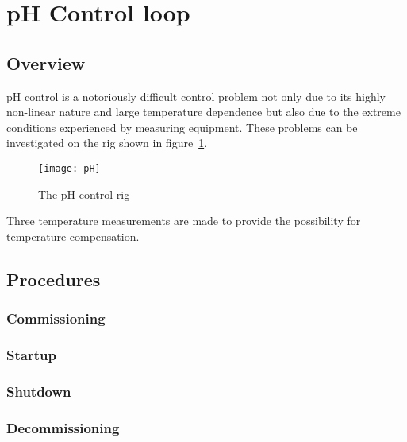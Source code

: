 \section{pH Control loop}
\subsection{Overview}
pH control is a notoriously difficult control problem not only due to its highly non-linear nature and large temperature dependence but also due to the extreme conditions experienced by measuring equipment. These problems can be investigated on the rig shown in figure~\ref{fig:rig:ph}.
\begin{figure}
	\centering
	\texttt{[image: pH]}
	\caption{The pH control rig}
	\label{fig:rig:ph}
\end{figure}
Three temperature measurements are made to provide the possibility for temperature compensation.

\subsection{Procedures}

\subsubsection{Commissioning}

\subsubsection{Startup}

\subsubsection{Shutdown}

\subsubsection{Decommissioning}
